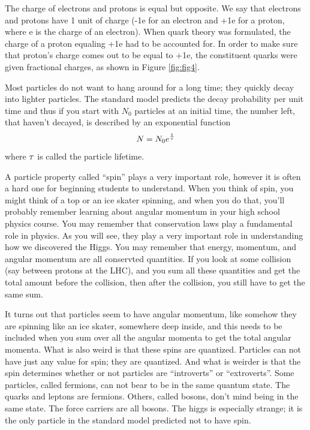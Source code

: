 The charge of electrons and protons is equal but opposite. We say that electrons and protons have 1 unit of charge (-1e for an electron and +1e for a proton, where e is the charge of an electron). When quark theory was formulated, the charge of a proton equaling +1e had to be accounted for. In order to make sure that proton’s charge comes out to be equal to +1e, the constituent quarks were given fractional charges, as shown in Figure \ref{fig:fig4}.


Most particles do not want to hang around for a long time; they quickly decay into lighter particles.  The standard model predicts the decay probability per unit time and thus if you start with $N_0$ particles at an initial time, the number left, that haven't decayed, is described by an exponential function
\begin{equation}
N=N_0 e^{t \over \tau}
\end{equation}
where ${\rm \tau}$ is called the particle lifetime.


A particle property called ``spin'' plays a very important role, however it is often a hard one for beginning students to understand.
When you think of spin, you might think of a top or an ice skater spinning, and when you do that, you'll probably remember learning about angular momentum in your high school physics course.  You may remember that conservation laws play a fundamental role in physics.  As you will see, they play a very important role in understanding how we discovered the Higgs.  You may remember that energy, momentum, and angular momentum are all conservted quantities.  If you look at some collision (say between protons at the LHC), and you sum all these quantities and get the total amount before the collision, then after the collision, you still have to get the same sum.  

It turns out that particles seem to have angular momentum, like somehow they are spinning like an ice skater, somewhere deep inside, and this needs to be included when you sum over all the angular momenta to get the total angular momenta.  What is also weird is that these spins are quantized.  Particles can not have just any value for spin; they are quantized.  And what is weirder is that the spin determines whether or not particles are ``introverts'' or ``extroverts''.  Some particles, called fermions, can not bear to be in the same quantum state.  The quarks and leptons are fermions.  Others, called bosons, don't mind being in the same state.  The force carriers are all bosons.  The higgs is especially strange; it is the only particle in the standard model predicted not to have spin.



